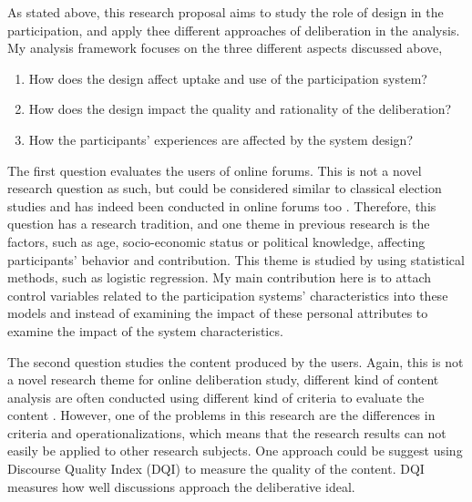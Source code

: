 \documentclass{article}
\begin{document}
As stated above, this research proposal aims to study the role of design in the participation, and apply thee different approaches of deliberation in the analysis. My analysis framework focuses on the three different aspects discussed above,

\begin{enumerate}
\item How does the design affect uptake and use of the participation system?
\item How does the design impact the quality and rationality of the deliberation?
\item How the participants' experiences are affected by the system design?
\end{enumerate}

The first question evaluates the users of online forums. This is not a novel research question as such, but could be considered similar to classical election studies and has indeed been conducted in online forums too . Therefore, this question has a research tradition, and one theme in previous research is the factors, such as age, socio-economic status or political knowledge, affecting participants' behavior and contribution. This theme is studied by using statistical methods, such as logistic regression. My main contribution here is to attach control variables related to the participation systems' characteristics into these models and instead of examining the impact of these personal attributes to examine the impact of the system characteristics.

The second question studies the content produced by the users. Again, this is not a novel research theme for online deliberation study, different kind of content analysis are often conducted using different kind of criteria to evaluate the content . However, one of the problems in this research are the differences in criteria and operationalizations, which means that the research results can not easily be applied to other research subjects. One approach could be suggest using   Discourse Quality Index (DQI) to measure the quality of the content. DQI measures how well discussions approach the deliberative ideal. %
\end{document}
